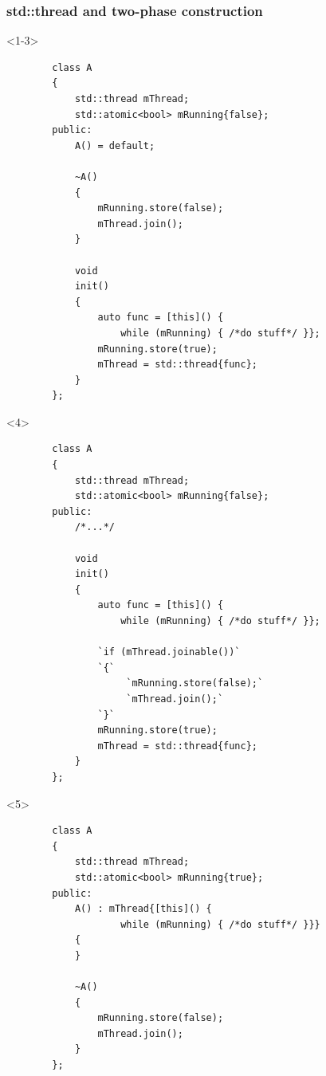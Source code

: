 \documentclass{beamer}
\begin{document}
\begin{frame}[fragile,t]
\frametitle{std::thread and two-phase construction}

    \begin{onlyenv}<1-3>
    \begin{lstlisting}
        class A
        {
            std::thread mThread;
            std::atomic<bool> mRunning{false};
        public:
            A() = default;

            ~A()
            { 
                mRunning.store(false); 
                mThread.join();
            }

            void
            init()
            {
                auto func = [this]() { 
                    while (mRunning) { /*do stuff*/ }};
                mRunning.store(true);
                mThread = std::thread{func};
            }
        };
    \end{lstlisting}
    \end{onlyenv}
    
    \begin{onlyenv}<4>
    \begin{lstlisting}
        class A
        {
            std::thread mThread;
            std::atomic<bool> mRunning{false};
        public:
            /*...*/

            void
            init()
            {
                auto func = [this]() { 
                    while (mRunning) { /*do stuff*/ }};

                `if (mThread.joinable())`
                `{`
                     `mRunning.store(false);`
                     `mThread.join();`
                `}`
                mRunning.store(true);
                mThread = std::thread{func};
            }
        };
    \end{lstlisting}
    \end{onlyenv}

    \begin{onlyenv}<5>
    \begin{lstlisting}
        class A
        {
            std::thread mThread;
            std::atomic<bool> mRunning{true};
        public:
            A() : mThread{[this]() { 
                    while (mRunning) { /*do stuff*/ }}}
            {
            }

            ~A()
            { 
                mRunning.store(false); 
                mThread.join();
            }
        };
    \end{lstlisting}
    \end{onlyenv}
    

\end{frame}
\end{document}
